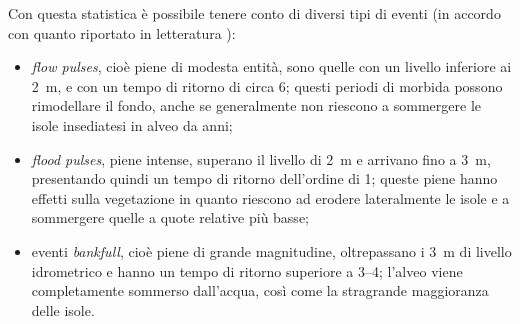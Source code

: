 Con questa statistica è possibile tenere conto di diversi tipi di eventi (in accordo con quanto riportato in letteratura ):
%
\begin{itemize}
	\item \emph{flow pulses}, cioè piene di modesta entità, sono quelle con un livello inferiore ai \SI{2}{\m}, e con un tempo di ritorno di circa \SI{6}{\mesi}; questi periodi di morbida possono rimodellare il fondo, anche se generalmente non riescono a sommergere le isole insediatesi in alveo da anni;
	\item \emph{flood pulses}, piene intense, superano il livello di \SI{2}{\m} e arrivano fino a \SI{3}{\m}, presentando quindi un tempo di ritorno dell'ordine di \SI{1}{\anno}; queste piene hanno effetti sulla vegetazione in quanto riescono ad erodere lateralmente le isole e a sommergere quelle a quote relative più basse;
	\item eventi \emph{bankfull}, cioè piene di grande magnitudine, oltrepassano i \SI{3}{\m} di livello idrometrico e hanno un tempo di ritorno superiore a \SIrange[range-phrase={-}]{3}{4}{\anni}; l'alveo viene completamente sommerso dall'acqua, così come la stragrande maggioranza delle isole.
\end{itemize}
%

